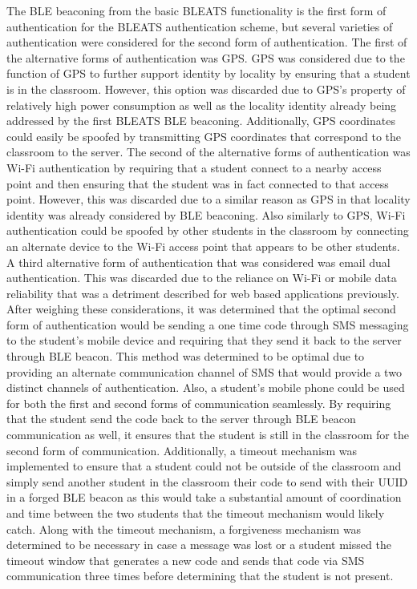 The BLE beaconing from the basic BLEATS functionality is the first form of
authentication for the BLEATS authentication scheme, but several varieties of
authentication were considered for the second form of authentication. The first
of the alternative forms of authentication was GPS. GPS was considered due to
the function of GPS to further support identity by locality by ensuring that a
student is in the classroom. However, this option was discarded due to GPS’s
property of relatively high power consumption as well as the locality identity
already being addressed by the first BLEATS BLE beaconing. Additionally, GPS
coordinates could easily be spoofed by transmitting GPS coordinates that
correspond to the classroom to the server. The second of the alternative forms
of authentication was Wi-Fi authentication by requiring that a student connect
to a nearby access point and then ensuring that the student was in fact
connected to that access point. However, this was discarded due to a similar
reason as GPS in that locality identity was already considered by BLE
beaconing. Also similarly to GPS, Wi-Fi authentication could be spoofed by
other students in the classroom by connecting an alternate device to the Wi-Fi
access point that appears to be other students. A third alternative form of
authentication that was considered was email dual authentication. This was
discarded due to the reliance on Wi-Fi or mobile data reliability that was a
detriment described for web based applications previously.  After weighing
these considerations, it was determined that the optimal second form of
authentication would be sending a one time code through SMS messaging to the
student’s mobile device and requiring that they send it back to the server
through BLE beacon. This method was determined to be optimal due to providing
an alternate communication channel of SMS that would provide a two distinct
channels of authentication. Also, a student’s mobile phone could be used for
both the first and second forms of communication seamlessly. By requiring that
the student send the code back to the server through BLE beacon communication
as well, it ensures that the student is still in the classroom for the second
form of communication. Additionally, a timeout mechanism was implemented to
ensure that a student could not be outside of the classroom and simply send
another student in the classroom their code to send with their UUID in a forged
BLE beacon as this would take a substantial amount of coordination and time
between the two students that the timeout mechanism would likely catch. Along
with the timeout mechanism, a forgiveness mechanism was determined to be
necessary in case a message was lost or a student missed the timeout window
that generates a new code and sends that code via SMS communication three times
before determining that the student is not present.

